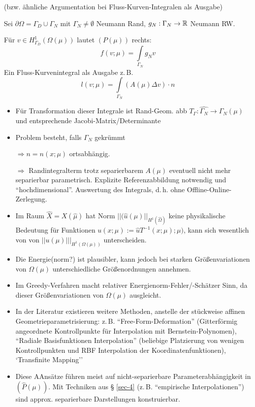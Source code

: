 \begin{bem}
(bzw. ähnliche Argumentation bei Fluss-Kurven-Integralen als Ausgabe)

Sei $\partial \Omega = \Gamma_D \cup \Gamma_N$ mit $\Gamma_N \neq \emptyset$ Neumann Rand, $g_N: \Gamma_N \rightarrow \mathbb{R}$ Neumann RW.

Für $v \in H_{\Gamma_D}^1 (\Omega(\mu))$ lautet $(P(\mu))$ rechts:
\[
	f(v;\mu) = \int\limits_{\Gamma_N} g_N v
\]
Ein Fluss-Kurvenintegral als Ausgabe z.\,B.
\[
	l(v;\mu) = \int\limits_{\Gamma_N} (A(\mu) \Delta v)\cdot n
\]
\begin{itemize}
	\item Für  Transformation dieser Integrale ist Rand-Geom. abb $T_{\Gamma} : \hat{\Gamma_N} \rightarrow \Gamma_N (\mu)$ und entsprechende Jacobi-Matrix/Determinante
	\item Problem besteht, falls $\Gamma_N$ gekrümmt
		
		$\Rightarrow n=n(x;\mu)$ ortsabhängig.
		
		$\Rightarrow$ Randintegralterm trotz separierbarem $A(\mu)$ eventuell nicht mehr separierbar parametrisch. Explizite Referenzabbildung notwendig und ``hochdimensional''. Auswertung des Integrals, d.\,h. ohne Offline-Online-Zerlegung.
\end{itemize}
\end{bem}

\begin{bem}[Fehlermaße] \beginwithlistbem
	\begin{itemize}
		\item Im Raum $\hat{X} = X(\hat{\mu})$ hat Norm $|| (\hat{u}(\mu)||_{H^1(\hat{\Omega})}$ keine physikalische Bedeutung für Funktionen $u(x;\mu) := \hat{u} T^{-1}(x;\mu);\mu)$, kann sich wesentlich von von $||u(\mu)|||_{H^1(\Omega(\mu))}$ unterscheiden.
		\item Die Energie(norm?) ist plausibler, kann jedoch bei starken Größenvariationen von $\Omega(\mu)$ unterschiedliche Größenordnungen annehmen.
		\item Im Greedy-Verfahren macht relativer  Energienorm-Fehler/-Schätzer Sinn, da dieser Größenvariationen von $\Omega (\mu)$ ausgleicht.
	\end{itemize}
\end{bem}

\begin{bem} \beginwithlistbem
	\begin{itemize}
		\item In der Literatur existieren weitere Methoden, anstelle der stückweise affinen Geometrieparametrisierung: z.\,B. ``Free-Form-Deformation'' (Gitterförmig angeordnete Kontrollpunkte für Interpolation mit Bernstein-Polynomen), ``Radiale Basisfunktionen Interpolation'' (beliebige Platzierung von wenigen Kontrollpunkten und RBF Interpolation der Koordinatenfunktionen), `Transfinite Mapping''
		\item Diese AAnsätze führen meist auf nicht-separierbare Parameterabhängigkeit in $(\hat{P}(\mu))$. Mit Techniken aus § \ref{sec-4} (z.\,B. ``empirische Interpolationen'') sind approx. separierbare Darstellungen konstruierbar.
	\end{itemize}
\end{bem}